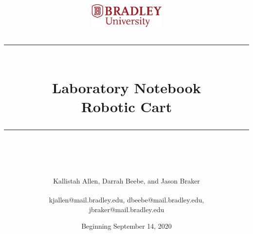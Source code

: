 \documentclass[fontsize=11pt, %
                             paper=letter, %
                             openany, %
                             captions=tableheading,
                             index=totoc,
                             hyperref]{labbook}
\newcommand{\HRule}{\rule{\linewidth}{0.5mm}} %
\begin{document}


%

\title{
\begin{center}
\href{http://www.bradley.edu}{\includegraphics[height=0.5in]{figs/logoBU1-Print}}
\vskip10pt
\HRule \\[0.4cm]
{\Huge \bfseries Laboratory Notebook \\[0.5cm] \Large Robotic Cart}\\[0.4cm] %
\HRule \\[1.5cm]
\end{center}
}
\author{ Kallistah Allen, Darrah Beebe, and Jason Braker \\ \\\Large kjallen@mail.bradley.edu, dbeebe@mail.bradley.edu, \\jbraker@mail.bradley.edu} %
\date{Beginning September 14, 2020} %
\maketitle


\printindex
\tableofcontents %
\newpage %
\end{document}
